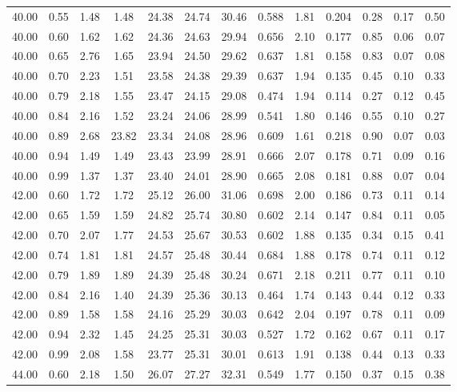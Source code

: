 \begin{longtable}{lc|cccc|cc|cc|ccc}
\hline
40.00 & 0.55 & 1.48 & 1.48 & 24.38 & 24.74 & 30.46 & 0.588 & 1.81 & 0.204 & 0.28 & 0.17 & 0.50\\
40.00 & 0.60 & 1.62 & 1.62 & 24.36 & 24.63 & 29.94 & 0.656 & 2.10 & 0.177 & 0.85 & 0.06 & 0.07\\
40.00 & 0.65 & 2.76 & 1.65 & 23.94 & 24.50 & 29.62 & 0.637 & 1.81 & 0.158 & 0.83 & 0.07 & 0.08\\
40.00 & 0.70 & 2.23 & 1.51 & 23.58 & 24.38 & 29.39 & 0.637 & 1.94 & 0.135 & 0.45 & 0.10 & 0.33\\
40.00 & 0.79 & 2.18 & 1.55 & 23.47 & 24.15 & 29.08 & 0.474 & 1.94 & 0.114 & 0.27 & 0.12 & 0.45\\
40.00 & 0.84 & 2.16 & 1.52 & 23.24 & 24.06 & 28.99 & 0.541 & 1.80 & 0.146 & 0.55 & 0.10 & 0.27\\
40.00 & 0.89 & 2.68 & 23.82 & 23.34 & 24.08 & 28.96 & 0.609 & 1.61 & 0.218 & 0.90 & 0.07 & 0.03\\
40.00 & 0.94 & 1.49 & 1.49 & 23.43 & 23.99 & 28.91 & 0.666 & 2.07 & 0.178 & 0.71 & 0.09 & 0.16\\
40.00 & 0.99 & 1.37 & 1.37 & 23.40 & 24.01 & 28.90 & 0.665 & 2.08 & 0.181 & 0.88 & 0.07 & 0.04\\
\hline
42.00 & 0.60 & 1.72 & 1.72 & 25.12 & 26.00 & 31.06 & 0.698 & 2.00 & 0.186 & 0.73 & 0.11 & 0.14\\
42.00 & 0.65 & 1.59 & 1.59 & 24.82 & 25.74 & 30.80 & 0.602 & 2.14 & 0.147 & 0.84 & 0.11 & 0.05\\
42.00 & 0.70 & 2.07 & 1.77 & 24.53 & 25.67 & 30.53 & 0.602 & 1.88 & 0.135 & 0.34 & 0.15 & 0.41\\
42.00 & 0.74 & 1.81 & 1.81 & 24.57 & 25.48 & 30.44 & 0.684 & 1.88 & 0.178 & 0.74 & 0.11 & 0.12\\
42.00 & 0.79 & 1.89 & 1.89 & 24.39 & 25.48 & 30.24 & 0.671 & 2.18 & 0.211 & 0.77 & 0.11 & 0.10\\
42.00 & 0.84 & 2.16 & 1.40 & 24.39 & 25.36 & 30.13 & 0.464 & 1.74 & 0.143 & 0.44 & 0.12 & 0.33\\
42.00 & 0.89 & 1.58 & 1.58 & 24.16 & 25.29 & 30.03 & 0.642 & 2.04 & 0.197 & 0.78 & 0.11 & 0.09\\
42.00 & 0.94 & 2.32 & 1.45 & 24.25 & 25.31 & 30.03 & 0.527 & 1.72 & 0.162 & 0.67 & 0.11 & 0.17\\
42.00 & 0.99 & 2.08 & 1.58 & 23.77 & 25.31 & 30.01 & 0.613 & 1.91 & 0.138 & 0.44 & 0.13 & 0.33\\
\hline
44.00 & 0.60 & 2.18 & 1.50 & 26.07 & 27.27 & 32.31 & 0.549 & 1.77 & 0.150 & 0.37 & 0.15 & 0.38\\

\end{longtable}

